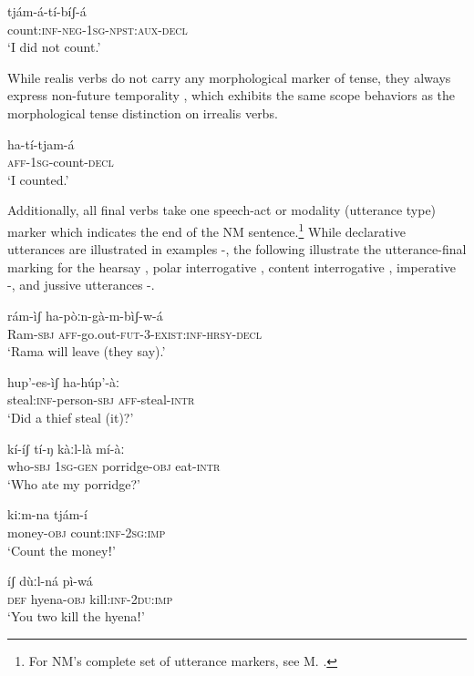 \documentclass[output=paper]{langsci/langscibook}
\begin{document}
\ea\label{ex:mahland:7}
\gll tjám-á-tí-bíʃ-{\downstep}á\\
count:\textsc{inf-neg-1sg-npst:aux-decl} \\
\glt `I did not count.'
\z

While realis verbs do not carry any morphological marker of tense, they always express non-future temporality , which exhibits the same scope behaviors as the morphological tense distinction on irrealis verbs. 

\ea\label{ex:mahland:8}
\gll ha-tí-tjam-á\\
\textsc{aff-1sg}{}-count-\textsc{decl} \\
\glt `I counted.'
\z

Additionally, all final verbs take one speech-act or modality (utterance type) marker which indicates the end of the NM sentence.\footnote{For NM's complete set of utterance markers, see M. \citet[469]{Ahland2012}.} While declarative utterances are illustrated in examples -, the following illustrate the utterance-final marking for the hearsay , polar interrogative , content interrogative , imperative -, and jussive utterances -. 

\ea\label{ex:mahland:9}
\gll rám-ìʃ  ha-pòːn-gà-m-bìʃ-w-á        \\
Ram-\textsc{sbj} \textsc{aff}{}-go.out-\textsc{fut-3-exist:inf-hrsy-decl} \\
\glt `Rama will leave (they say).'
\z 

\ea\label{ex:mahland:10}
\gll hup'-es-ìʃ                 ha-húp'-àː     \\
steal:\textsc{inf}{}-person-\textsc{sbj   aff}{}-steal-\textsc{intr}\\
\glt `Did a thief steal (it)?'
\z

\ea\label{ex:mahland:11}
\gll kí-íʃ           tí-ŋ          kàːl-là            mí-àː   \\
who-\textsc{sbj}   1\textsc{sg-gen}   porridge-\textsc{obj} eat-\textsc{intr}\\
\glt `Who ate my porridge?'
\z

\ea\label{ex:mahland:12}
\gll kiːm-na       tjám-í   \\
money\textsc{{}-obj}   count:\textsc{inf-2sg:imp}\\
\glt `Count the moneyǃ'
\z

\ea\label{ex:mahland:13}
\gll íʃ     dùːl-ná       pì-wá \\
\textsc{def}   hyena-\textsc{obj}   kill:\textsc{inf-2du:imp}\\
\glt `You two kill the hyenaǃ'
\z
\end{document}
